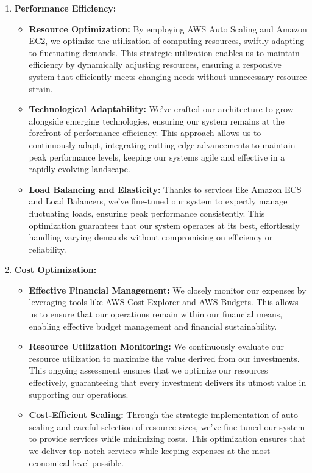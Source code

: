\documentclass{article}
\begin{document}
\begin{enumerate}
     \item \textbf{Performance Efficiency:} \cite{Performance}
    \begin{itemize}
        \item \textbf{Resource Optimization:} By employing AWS Auto Scaling and Amazon EC2, we optimize the utilization of computing resources, swiftly adapting to fluctuating demands. This strategic utilization enables us to maintain efficiency by dynamically adjusting resources, ensuring a responsive system that efficiently meets changing needs without unnecessary resource strain.
        \item \textbf{Technological Adaptability:} We've crafted our architecture to grow alongside emerging technologies, ensuring our system remains at the forefront of performance efficiency. This approach allows us to continuously adapt, integrating cutting-edge advancements to maintain peak performance levels, keeping our systems agile and effective in a rapidly evolving landscape.
        \item  \textbf{Load Balancing and Elasticity:} Thanks to services like Amazon ECS and Load Balancers, we've fine-tuned our system to expertly manage fluctuating loads, ensuring peak performance consistently. This optimization guarantees that our system operates at its best, effortlessly handling varying demands without compromising on efficiency or reliability.
    \end{itemize}

    \item \textbf{Cost Optimization:} \cite{Cost Optimization}
    \begin{itemize}
        \item \textbf{Effective Financial Management:} We closely monitor our expenses by leveraging tools like AWS Cost Explorer and AWS Budgets. This allows us to ensure that our operations remain within our financial means, enabling effective budget management and financial sustainability.
        \item \textbf{Resource Utilization Monitoring:} We continuously evaluate our resource utilization to maximize the value derived from our investments. This ongoing assessment ensures that we optimize our resources effectively, guaranteeing that every investment delivers its utmost value in supporting our operations.
        \item  \textbf{Cost-Efficient Scaling:} Through the strategic implementation of auto-scaling and careful selection of resource sizes, we've fine-tuned our system to provide services while minimizing costs. This optimization ensures that we deliver top-notch services while keeping expenses at the most economical level possible.
    \end{itemize}


\end{enumerate}
\end{document}
